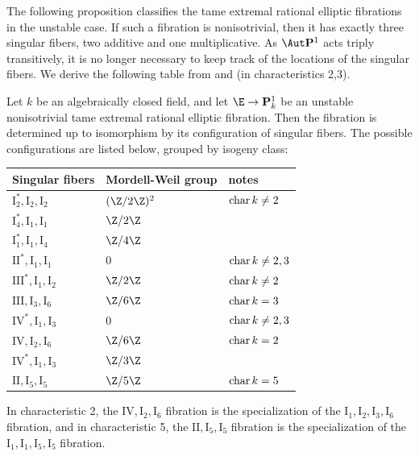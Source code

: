 \documentclass{article}
\DeclareMathOperator{\car}{{\rm char}}
\def\P{\mathbf{P}}
\newcommand{\II}{\mathrm{II}}
\newcommand{\III}{\mathrm{III}}
\newcommand{\I}{\mathrm{I}}
\newcommand{\IV}{\mathrm{IV}}
\begin{document}
The following proposition classifies the tame extremal rational elliptic fibrations in the unstable case.   If such a fibration is nonisotrivial, then it has exactly three singular fibers, two additive and one multiplicative.  As $\Aut\P^1$ acts triply transitively, it is no longer necessary to keep track of the locations of the singular fibers.  We derive the following table from \cite{MirandaPersson} and \cite{Ito} (in characteristics 2,3).

\begin{prop} \label{PropClassificationUnstable} Let $k$ be an algebraically closed field, and let $\E\to \P^1_k$ be an unstable nonisotrivial tame extremal rational elliptic fibration.  Then the fibration is determined up to isomorphism by its configuration of singular fibers.  The possible configurations are listed below, grouped by isogeny class:

\begin{center}
\begin{tabular}{|l|l|l|}
\hline
Singular fibers & Mordell-Weil group & notes \\
\hline \hline
$\I_2^*,\I_2,\I_2$ & $(\Z/2\Z)^2$ & $\car k\neq 2$ \\
$\I_4^*,\I_1,\I_1$ & $\Z/2\Z$ & \\
$\I_1^*,\I_1,\I_4$ & $\Z/4\Z$ & \\
\hline\hline
$\II^*,\I_1,\I_1$ & $0$  & $\car k\neq 2,3$\\
\hline \hline
$\III^*,\I_1,\I_2$ & $\Z/2\Z$ & $\car k\neq 2$\\
$\III,\I_3,\I_6$ & $\Z/6\Z$ & $\car k=3$\\
\hline\hline
$\IV^*,\I_1,\I_3$ & $0$ & $\car k \neq 2,3$\\
\hline\hline
$\IV,\I_2,\I_6$ & $\Z/6\Z$& $\car k = 2$\\
$\IV^*,\I_1,\I_3$ & $\Z/3\Z$ & \\
\hline\hline
$\II,\I_5,\I_5$ & $\Z/5\Z$ &$\car k=5$\\
\hline
\end{tabular}
\end{center}
\end{prop}

\begin{rmk} In characteristic 2, the $\IV,\I_2,\I_6$ fibration is the specialization of the $\I_1,\I_2,\I_3,\I_6$ fibration, and in characteristic 5, the $\II,\I_5,\I_5$ fibration is the specialization of the $\I_1,\I_1,\I_5,\I_5$ fibration.  
\end{rmk}
\end{document}
